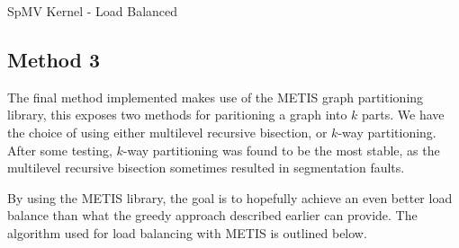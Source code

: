 \documentclass{article}
\begin{document}
    \begin{algorithm}[H]
        \caption{SpMV Kernel - Load Balanced}
        \SetAlgoVlined

    \end{algorithm}

    \subsection{Method 3}
    The final method implemented makes use of the METIS graph partitioning library, this exposes two methods for paritioning a graph into \( k \) parts. We have the choice of using either multilevel recursive bisection, or \( k \)-way partitioning. After some testing, \( k \)-way partitioning was found to be the most stable, as the multilevel recursive bisection sometimes resulted in segmentation faults. 
    \medskip

    By using the METIS library, the goal is to hopefully achieve an even better load balance than what the greedy approach described earlier can provide. The algorithm used for load balancing with METIS is outlined below.
\end{document}
